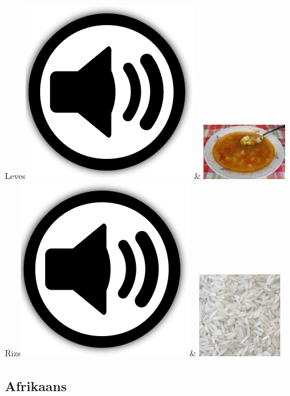 \documentclass[letterpaper,twoside,openright,11pt,final]{memoir}
\newcommand{\smallimage}{100pt}
\newcommand{\audio}{{\includegraphics[scale=0.05]{audio}}}
\begin{document}
{\begin{longtabu}
Leves\audio{}& \includegraphics[width=\smallimage]{./images/leves}\\
Rizs\audio{}& \includegraphics[width=\smallimage]{./images/rizs}\\
\end{longtabu}
}

\newpage
\subsection{Afrikaans}
\end{document}
